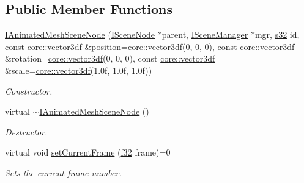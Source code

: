 \subsection*{Public Member Functions}
\begin{DoxyCompactItemize}
\item 
\mbox{\label{classirr_1_1scene_1_1IAnimatedMeshSceneNode_a6c76b97d6e587e81e057a038dde0956b}} 
\hyperlink{classirr_1_1scene_1_1IAnimatedMeshSceneNode_a6c76b97d6e587e81e057a038dde0956b}{I\+Animated\+Mesh\+Scene\+Node} (\hyperlink{classirr_1_1scene_1_1ISceneNode}{I\+Scene\+Node} $\ast$parent, \hyperlink{classirr_1_1scene_1_1ISceneManager}{I\+Scene\+Manager} $\ast$mgr, \hyperlink{namespaceirr_ac66849b7a6ed16e30ebede579f9b47c6}{s32} id, const \hyperlink{namespaceirr_1_1core_ae6e2b2a6c552833ebbd5b7463d03586b}{core\+::vector3df} \&position=\hyperlink{namespaceirr_1_1core_ae6e2b2a6c552833ebbd5b7463d03586b}{core\+::vector3df}(0, 0, 0), const \hyperlink{namespaceirr_1_1core_ae6e2b2a6c552833ebbd5b7463d03586b}{core\+::vector3df} \&rotation=\hyperlink{namespaceirr_1_1core_ae6e2b2a6c552833ebbd5b7463d03586b}{core\+::vector3df}(0, 0, 0), const \hyperlink{namespaceirr_1_1core_ae6e2b2a6c552833ebbd5b7463d03586b}{core\+::vector3df} \&scale=\hyperlink{namespaceirr_1_1core_ae6e2b2a6c552833ebbd5b7463d03586b}{core\+::vector3df}(1.\+0f, 1.\+0f, 1.\+0f))
\begin{DoxyCompactList}\small\item\em Constructor. \end{DoxyCompactList}\item 
\mbox{\label{classirr_1_1scene_1_1IAnimatedMeshSceneNode_ae914c207eb12ae9025bfd102922c01cf}} 
virtual \hyperlink{classirr_1_1scene_1_1IAnimatedMeshSceneNode_ae914c207eb12ae9025bfd102922c01cf}{$\sim$\+I\+Animated\+Mesh\+Scene\+Node} ()
\begin{DoxyCompactList}\small\item\em Destructor. \end{DoxyCompactList}\item 
virtual void \hyperlink{classirr_1_1scene_1_1IAnimatedMeshSceneNode_aff1c1e2270f4d3d94e58e7c130c575a4}{set\+Current\+Frame} (\hyperlink{namespaceirr_a0277be98d67dc26ff93b1a6a1d086b07}{f32} frame)=0
\begin{DoxyCompactList}\small\item\em Sets the current frame number. \end{DoxyCompactList}\item 

\end{DoxyCompactItemize}
